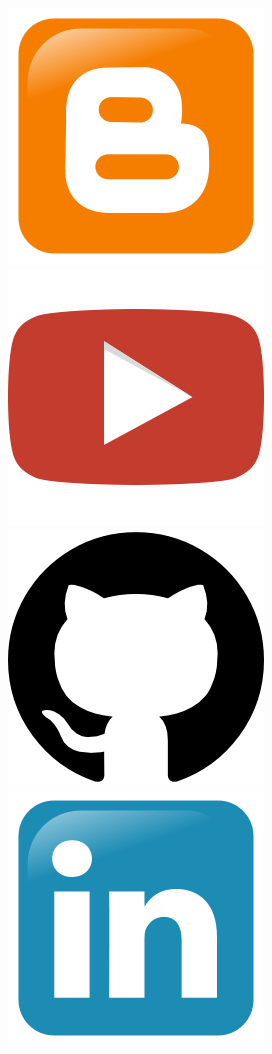 \href{https://labdls.blogspot.mx}{\includegraphics[scale=0.1]{src/ch0/blogger_logo.png}}
\href{https://www.youtube.com/user/lab2dls}{\includegraphics[scale=0.1]{src/ch0/youtube_logo.png}}
\href{https://github.com/JorgeDeLosSantos}{\includegraphics[scale=0.08]{src/ch0/github_logo.png}}
\href{https://www.linkedin.com/in/pjdlsl}{\includegraphics[scale=0.1]{src/ch0/linkedin_logo.png}}
